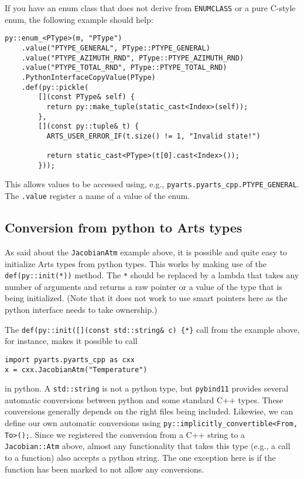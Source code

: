If you have an enum class that does not derive from \verb|ENUMCLASS| or a pure C-style enum, the following example should help:
\begin{verbatim}
py::enum_<PType>(m, "PType")
    .value("PTYPE_GENERAL", PType::PTYPE_GENERAL)
    .value("PTYPE_AZIMUTH_RND", PType::PTYPE_AZIMUTH_RND)
    .value("PTYPE_TOTAL_RND", PType::PTYPE_TOTAL_RND)
    .PythonInterfaceCopyValue(PType)
    .def(py::pickle(
        [](const PType& self) {
          return py::make_tuple(static_cast<Index>(self));
        },
        [](const py::tuple& t) {
          ARTS_USER_ERROR_IF(t.size() != 1, "Invalid state!")
          
          return static_cast<PType>(t[0].cast<Index>());
        }));
\end{verbatim}
This allows values to be accessed using, e.g., \verb|pyarts.pyarts_cpp.PTYPE_GENERAL|.  The \verb|.value| register a name of a value of the enum.

\subsection{Conversion from python to Arts types}
As said about the \verb|JacobianAtm| example above, it is possible and quite easy to initialize Arts types from python types.  This works by
making use of the \verb|def(py::init(*))| method.  The \verb|*| should be replaced by a lambda that takes any number of arguments and 
returns a raw pointer or a value of the type that is being initialized.  (Note that it does not work to use smart pointers here as
the python interface needs to take ownership.)

The \verb|def(py::init([](const std::string& c) {*}| call from the example above, for instance, makes it possible to call
\begin{verbatim}
import pyarts.pyarts_cpp as cxx
x = cxx.JacobianAtm("Temperature")
\end{verbatim}
in python.  A \verb|std::string| is not a python type, but \verb|pybind11| provides several automatic conversions between
python and some standard C++ types.  These conversions generally depends on the right files being included.
Likewise, we can define our own automatic conversions using \verb|py::implicitly_convertible<From, To>();|.  Since we registered the 
conversion from a C++ string to a \verb|Jacobian::Atm| above, almost any functionality that takes this type (e.g., a call to a function)
also accepts a python string.  The one exception here is if the function has been marked to not allow any conversions.

